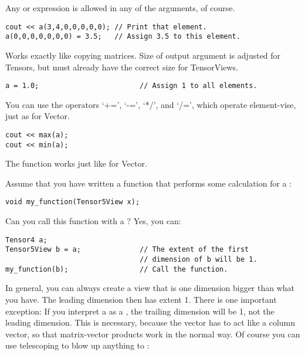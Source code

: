 Any  or  expression is allowed in any of the
arguments, of course.

\begin{verbatim}
cout << a(3,4,0,0,0,0,0); // Print that element.
a(0,0,0,0,0,0,0) = 3.5;   // Assign 3.5 to this element.
\end{verbatim}


Works exactly like copying matrices. Size of output argument is
adjusted for Tensors, but must already have the correct size for
TensorViews.

\begin{verbatim}
a = 1.0;                        // Assign 1 to all elements.
\end{verbatim}


You can use the operators `+=', `-=', `*/', and `/=', which operate
element-vise, just as for Vector.

\begin{verbatim}
cout << max(a);
cout << min(a);
\end{verbatim}


The function  works just like for Vector.


Assume that you have written a function that performs some calculation
for a :
\begin{verbatim}
void my_function(Tensor5View x);
\end{verbatim}

\noindent Can you call this function with a ? Yes, you can:
\begin{verbatim}
Tensor4 a;                      
Tensor5View b = a;              // The extent of the first
                                // dimension of b will be 1.
my_function(b);                 // Call the function.
\end{verbatim}

In general, you can always create a view that is one dimension bigger
than what you have. The leading dimension then has extent 1. There is
one important exception: If you interpret a  as a
, the trailing dimension will be 1, not the leading
dimension. This is necessary, because the vector has to act like a
column vector, so that matrix-vector products work in the normal way.
Of course you can use telescoping to blow up anything to
: 

